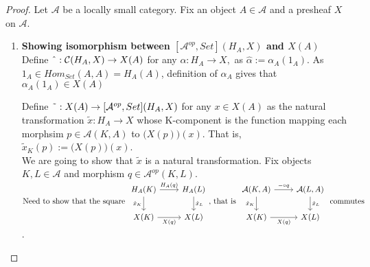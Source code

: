 \documentclass[18pt,a4paper]{article}
\theoremstyle{definition}
\begin{document}
\begin{proof}Let $\mathcal{A} $ be a locally small category.
	Fix an object $A \in \mathcal{A} $ and a presheaf $X$ on $\mathcal{A}$.

	\begin{enumerate}[label=\Roman*]
		\item \textbf{Showing isomorphism between $[\mathcal{A}^{op},Set](H_A,X)$
			and $X(A)$}\\
	Define $\string ^ :\mathcal{C}(H_A,X) \to X(A) $
	for any $\alpha:H_A \to X,$ as  $\hat{\alpha}:= \alpha_A(1_A)$.
	As $1_A \in Hom_{Set}(A,A)=H_A(A)$,
	definition of $\alpha_A$ gives that $\alpha_A(1_A)\in X(A)$

	Define $\string ~ : X(A) \to [\mathcal{A}^{op}, Set](H_A,X)$
	for any $ x \in X(A)$ as the natural transformation $\tilde{x} : H_A \to X$ whose
	K-component is the function mapping each morphsim $p \in \mathcal{A}(K,A)$
	to $\Big(X(p)\Big)(x)$. That is, $\tilde{x}_K (p):=\Big(X(p)\Big)(x)$.\\

	We are going to show that $\tilde{x}$ is a natural transformation.
	Fix objects $K,L \in \mathcal{A} $ and morphism $q \in \mathcal{A}^{op}(K,L)$.
	$\text{Need to show that the square }
	\begin{tikzcd}
		H_A(K) \arrow[swap]{d}{\tilde{x}_K} \arrow{r}{H_A(q)}
		& H_A(L) \arrow{d}{\tilde{x}_L}\\
		X(K) \arrow[swap]{r}{X(q)}
		& X(L)
	\end{tikzcd} \text{, that is }
	\begin{tikzcd}
		\mathcal{A}(K,A) \arrow[swap]{d}{\tilde{x}_K} \arrow{r}{ - \circ q}
		& \mathcal{A} (L,A) \arrow{d}{\tilde{x}_L}\\
		X(K) \arrow[swap]{r}{X(q)}
		& X(L)
	\end{tikzcd}\text{ commutes }$.\\


\end{enumerate}
\end{proof}
\end{document}
